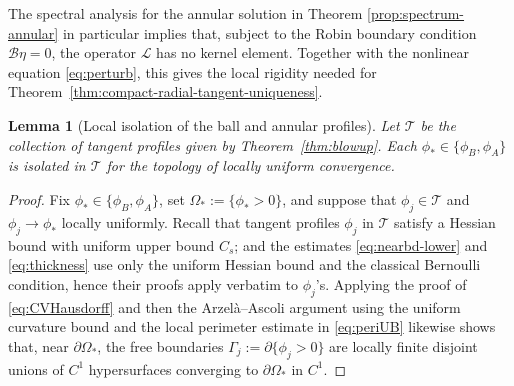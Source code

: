 \documentclass[11pt]{article}
\numberwithin{equation}{section}
\newtheorem{lemma}[theorem]{Lemma}
\theoremstyle{definition}
\begin{document}
The spectral analysis for the annular solution in Theorem \ref{prop:spectrum-annular} in particular implies that, subject to the Robin boundary condition $\mathscr{B} \eta =0$, the operator $\mathscr{L}$ has no kernel element. Together with the nonlinear equation \eqref{eq:perturb}, this gives the local rigidity needed for
Theorem~\ref{thm:compact-radial-tangent-uniqueness}. 

\begin{lemma}[Local isolation of the ball and annular profiles]\label{lem:compact-radial-local-isolation}
Let $\mathcal T$ be the collection of tangent profiles given by
Theorem~\ref{thm:blowup}. Each $\phi_*\in\{\phi_B,\phi_A\}$ is isolated in
$\mathcal T$ for the topology of locally uniform convergence.
\end{lemma}


\begin{proof}
Fix $\phi_*\in\{\phi_B,\phi_A\}$, set $\Omega_*:=\{\phi_*>0\}$, and suppose
that $\phi_j\in\mathcal T$ and $\phi_j\to\phi_*$ locally uniformly.
Recall that tangent profiles $\phi_j$ in $\mathcal{T}$ satisfy a Hessian bound with uniform upper bound $C_s$; and the estimates \eqref{eq:nearbd-lower} and \eqref{eq:thickness} use only the
uniform Hessian bound and the classical Bernoulli condition, hence their proofs apply verbatim to $\phi_j$'s. Applying the proof of \eqref{eq:CVHausdorff} and then the
Arzel\`a--Ascoli argument using the uniform curvature bound and the local
perimeter estimate in \eqref{eq:periUB} likewise shows that, near
$\partial\Omega_*$, the free boundaries
$\Gamma_j:=\partial\{\phi_j>0\}$ are locally finite disjoint unions of $C^1$
hypersurfaces converging to $\partial\Omega_*$ in $C^1$.


\end{proof}
\end{document}
